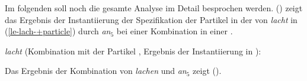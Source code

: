 Im folgenden soll noch die gesamte Analyse im Detail besprochen werden. () zeigt das Ergebnis
der Instantiierung der Spezifikation der Partikel in der \compsl
von \emph{lacht} in (\ref{le-lach-+particle}) durch \emph{an}$_5$ bei einer Kombination in einer
.
\newsavebox{\boxxcompdrei}
\ea
\begin{minipage}[t]{\linewidth}
\emph{lacht} (Kombination mit der Partikel \anf, Ergebnis der Instantiierung in \comps):\\
\end{minipage}
\z
Das Ergebnis der Kombination von \emph{lachen} und \emph{an$_5$} zeigt ().

